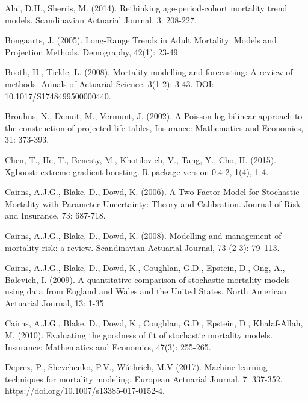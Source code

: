 \documentclass[fleqn,10pt]{wlscirep}
\begin{document}
%
\begin{thebibliography}{99}

Alai, D.H., Sherris, M. (2014). Rethinking age-period-cohort mortality trend models. Scandinavian Actuarial Journal, 3: 208-227.

Bongaarts, J. (2005). Long-Range Trends in Adult Mortality: Models and Projection Methods. Demography, 42(1): 23-49.

Booth, H., Tickle, L. (2008). Mortality modelling and forecasting: A review of methods. Annals of Actuarial Science, 3(1-2): 3-43. DOI: 10.1017/S1748499500000440.

Brouhns, N., Denuit, M., Vermunt, J. (2002). A Poisson log-bilinear approach to the construction of projected life tables, Insurance: Mathematics and Economics, 31: 373-393.

Chen, T., He, T., Benesty, M., Khotilovich, V., Tang, Y., Cho, H. (2015). Xgboost: extreme gradient boosting. R package version 0.4-2, 1(4), 1-4.

Cairns, A.J.G., Blake, D., Dowd, K. (2006). A Two-Factor Model for Stochastic Mortality with Parameter Uncertainty: Theory and Calibration. Journal of Risk and Insurance, 73: 687-718.

Cairns, A.J.G., Blake, D., Dowd, K. (2008). Modelling and management of mortality risk: a review. Scandinavian Actuarial Journal, 73 (2-3): 79–113.

Cairns, A.J.G., Blake, D., Dowd, K., Coughlan, G.D., Epstein, D., Ong, A., Balevich, I. (2009). A quantitative comparison of stochastic mortality models using data from England and Wales and the United States. North American Actuarial Journal, 13: 1-35.

Cairns, A.J.G., Blake, D., Dowd, K., Coughlan, G.D., Epstein, D., Khalaf-Allah, M. (2010). Evaluating the goodness of fit of stochastic mortality models. Insurance: Mathematics and Economics, 47(3): 255-265.

Deprez, P., Shevchenko, P.V., W\'uthrich, M.V (2017). Machine learning techniques for mortality modeling. European Actuarial Journal, 7: 337-352. https://doi.org/10.1007/s13385-017-0152-4.


\end{thebibliography}
\end{document}
